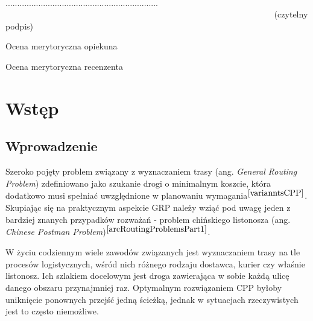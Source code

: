 \documentclass[a4paper, 12pt, twoside, openright]{article}
\begin{document}
\begin{center}

~~~~~~~~~~~~~~~~~~~~~~~~~~~~~~~~~~~~~~~~~~~~~~~~~~~~~~~~~~~~~~~~~ 
................................................................. \\
~~~~~~~~~~~~~~~~~~~~~~~~~~~~~~~~~~~~~~~~~~~~~~~~~~~~~~~~~~~~~~~  {\sf (czytelny podpis)} \\

\end{center}



\newpage
\linespread{1.3}
\selectfont

\hspace*{\fill}\large{Ocena merytoryczna opiekuna}

\vspace{85mm}

\newpage
\linespread{1.3}
\selectfont

\hspace*{\fill}\large{Ocena merytoryczna recenzenta}

\vspace{85mm}


\newpage
\tableofcontents


\newpage
\section{Wstęp}
\subsection{Wprowadzenie}
	\indent\par
	Szeroko pojęty problem związany z wyznaczaniem trasy (ang. \textit{General Routing Problem}) zdefiniowano jako szukanie drogi o minimalnym koszcie, która dodatkowo musi spełniać uwzględnione w planowaniu wymagania$^{\cite{varianntsCPP}}$.
	Skupiając się na praktycznym aspekcie GRP należy wziąć pod uwagę jeden z bardziej znanych przypadków rozważań - problem chińskiego listonosza (ang. \textit{Chinese Postman Problem})$^{\cite{arcRoutingProblemsPart1}}$. 


	W życiu codziennym wiele zawodów związanych jest wyznaczaniem trasy na tle procesów logistycznych, wśród nich różnego rodzaju dostawca, kurier czy właśnie listonosz. Ich szlakiem docelowym jest droga zawierająca w sobie każdą ulicę danego obszaru przynajmniej raz. Optymalnym rozwiązaniem CPP byłoby uniknięcie ponownych przejść jedną ścieżką, jednak w sytuacjach rzeczywistych jest to często niemożliwe.
\end{document}

